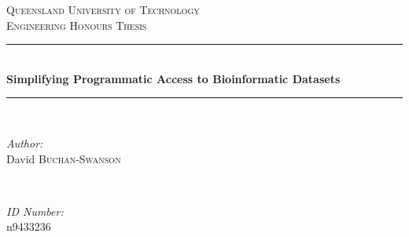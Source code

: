 
\begin{titlepage}

\newcommand{\HRule}{\rule{\linewidth}{0.5mm}} %

\centering %


\textsc{\LARGE Queensland University of Technology}\\[1cm] %
\textsc{\Large Engineering Honours Thesis}\\[0.5cm] %


\HRule \\[0.4cm]
{ \huge \bfseries Simplifying Programmatic Access to Bioinformatic Datasets}\\[0.2cm] %
\HRule \\[.5cm]


\begin{minipage}{0.45\textwidth}
\begin{flushleft} \large
\emph{Author:}\\
David \textsc{Buchan-Swanson}\\
\end{flushleft}
\end{minipage}
~
\begin{minipage}{0.45\textwidth}
\begin{flushright} \large
\emph{ID Number:}\\
n9433236\\
\end{flushright}
\end{minipage}\\[1.5cm]


\end{titlepage}
